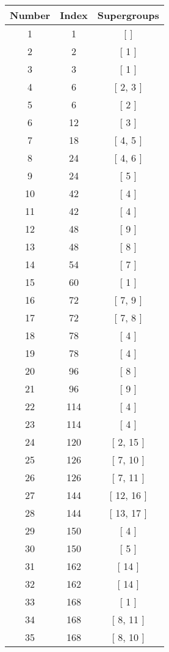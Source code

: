 \begin{center}
\begin{longtable}[H]{|| c c c ||}
\hline
Number & Index & Supergroups \\ 
\hline
1 & 1 & [ ] \\ 
\hline
2 & 2 & [ 1 ] \\ 
\hline
3 & 3 & [ 1 ] \\ 
\hline
4 & 6 & [ 2, 3 ] \\ 
\hline
5 & 6 & [ 2 ] \\ 
\hline
6 & 12 & [ 3 ] \\ 
\hline
7 & 18 & [ 4, 5 ] \\ 
\hline
8 & 24 & [ 4, 6 ] \\ 
\hline
9 & 24 & [ 5 ] \\ 
\hline
10 & 42 & [ 4 ] \\ 
\hline
11 & 42 & [ 4 ] \\ 
\hline
12 & 48 & [ 9 ] \\ 
\hline
13 & 48 & [ 8 ] \\ 
\hline
14 & 54 & [ 7 ] \\ 
\hline
15 & 60 & [ 1 ] \\ 
\hline
16 & 72 & [ 7, 9 ] \\ 
\hline
17 & 72 & [ 7, 8 ] \\ 
\hline
18 & 78 & [ 4 ] \\ 
\hline
19 & 78 & [ 4 ] \\ 
\hline
20 & 96 & [ 8 ] \\ 
\hline
21 & 96 & [ 9 ] \\ 
\hline
22 & 114 & [ 4 ] \\ 
\hline
23 & 114 & [ 4 ] \\ 
\hline
24 & 120 & [ 2, 15 ] \\ 
\hline
25 & 126 & [ 7, 10 ] \\ 
\hline
26 & 126 & [ 7, 11 ] \\ 
\hline
27 & 144 & [ 12, 16 ] \\ 
\hline
28 & 144 & [ 13, 17 ] \\ 
\hline
29 & 150 & [ 4 ] \\ 
\hline
30 & 150 & [ 5 ] \\ 
\hline
31 & 162 & [ 14 ] \\ 
\hline
32 & 162 & [ 14 ] \\ 
\hline
33 & 168 & [ 1 ] \\ 
\hline
34 & 168 & [ 8, 11 ] \\ 
\hline
35 & 168 & [ 8, 10 ] \\ 
\hline

\end{longtable}
\end{center}
